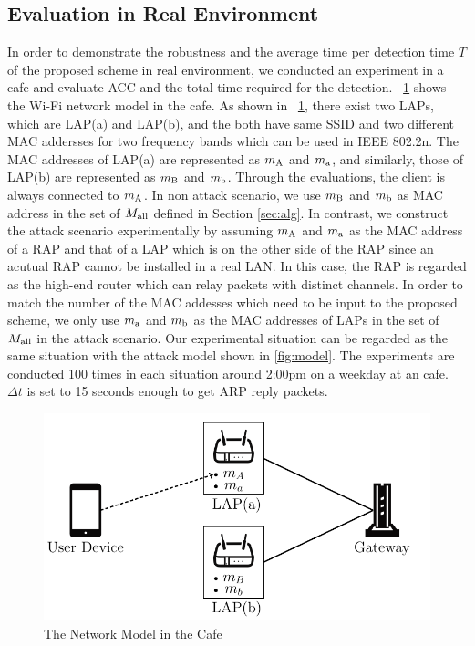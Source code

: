 \documentclass[conference]{IEEEtran}
\newcommand{\stba}{m_{\rm a}}
\newcommand{\stbA}{m_{\rm A}}
\newcommand{\stbb}{m_{\rm b}}
\newcommand{\stbB}{m_{\rm B}}
\begin{document}
\subsection{Evaluation in Real Environment}
In order to demonstrate the robustness and the average time per detection time $T$ of the proposed scheme in real environment, we conducted an experiment in a cafe and evaluate ACC and the total time required for the detection.
\figurename~\ref{fig:sbx} shows the Wi-Fi network model in the cafe.
As shown in \figurename~\ref{fig:sbx}, there exist two LAPs, which are LAP(a) and LAP(b), and the both have same SSID and two different MAC addersses for two frequency bands which can be used in IEEE 802.2n.
The MAC addresses of LAP(a) are represented as $\stbA$ and $\stba$, and similarly, those of LAP(b) are represented as $\stbB$ and $\stbb$.
Through the evaluations, the client is always connected to $\stbA$.
In non attack scenario, we use $\stbB$ and $\stbb$ as MAC address in the set of $M_{\rm all}$ defined in Section \ref{sec:alg}.
In contrast, we construct the attack scenario experimentally by assuming $\stbA$ and $\stba$ as the MAC address of a RAP and that of a LAP which is on the other side of the RAP since an acutual RAP cannot be installed in a real LAN.
In this case, the RAP is regarded as the high-end router which can relay packets with distinct channels.
In order to match the number of the MAC addesses which need to be input to the proposed scheme, we only use $\stba$ and $\stbb$ as the MAC addresses of LAPs in the set of $M_{\rm all}$  in the attack scenario.
Our experimental situation can be regarded as the same situation with the attack model shown in \ref{fig:model}.
The experiments are conducted 100 times in each situation around 2:00pm on a weekday at an cafe.
$\Delta t$ is set to 15 seconds enough to get ARP reply packets.
\begin{figure}[t]
    \begin{center}
        \includegraphics[scale=0.5]{starbucks/starbucks.pdf}
        \caption{The Network Model in the Cafe}
        \label{fig:sbx}
    \end{center}
    \vspace{-1zh}
\end{figure}
\end{document}
